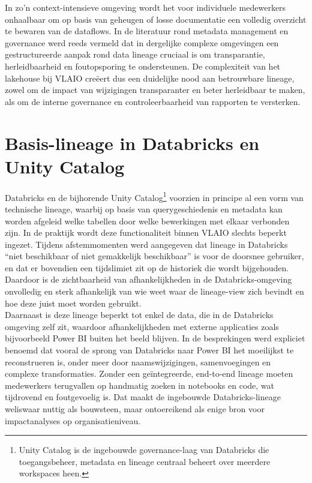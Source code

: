 In zo'n context-intensieve omgeving wordt het voor individuele medewerkers onhaalbaar om op basis van geheugen of losse documentatie een volledig overzicht te bewaren van de dataflows. In de literatuur rond metadata management en governance werd reeds vermeld dat in dergelijke complexe omgevingen een gestructureerde aanpak rond data lineage cruciaal is om transparantie, herleidbaarheid en foutopsporing te ondersteunen. De complexiteit van het lakehouse bij VLAIO creëert dus een duidelijke nood aan betrouwbare lineage, zowel om de impact van wijzigingen transparanter en beter herleidbaar te maken, als om de interne governance en controleerbaarheid van rapporten te versterken.\\

\section{Basis-lineage in Databricks en Unity Catalog}

Databricks en de bijhorende Unity Catalog\footnote{Unity Catalog is de ingebouwde governance-laag van Databricks die toegangsbeheer, metadata en lineage centraal beheert over meerdere workspaces heen.} voorzien in principe al een vorm van technische lineage, waarbij op basis van querygeschiedenis en metadata kan worden afgeleid welke tabellen door welke bewerkingen met elkaar verbonden zijn. In de praktijk wordt deze functionaliteit binnen VLAIO slechts beperkt ingezet. Tijdens afstemmomenten werd aangegeven dat lineage in Databricks “niet beschikbaar of niet gemakkelijk beschikbaar” is voor de doorsnee gebruiker, en dat er bovendien een tijdslimiet zit op de historiek die wordt bijgehouden. Daardoor is de zichtbaarheid van afhankelijkheden in de Databricks-omgeving onvolledig en sterk afhankelijk van wie weet waar de lineage-view zich bevindt en hoe deze juist moet worden gebruikt.\\

Daarnaast is deze lineage beperkt tot enkel de data, die in de Databricks omgeving zelf zit, waardoor afhankelijk\-heden met externe applicaties zoals bijvoorbeeld Power BI buiten het beeld blijven. In de besprekingen werd expliciet benoemd dat vooral de sprong van Databricks naar Power BI het moeilijkst te reconstrueren is, onder meer door naamswijzigingen, samenvoegingen en complexe transformaties. Zonder een geïntegreerde, end-to-end lineage moeten medewerkers terugvallen op handmatig zoeken in notebooks en code, wat tijdrovend en foutgevoelig is. Dat maakt de ingebouwde Databricks-lineage weliswaar nuttig als bouwsteen, maar ontoereikend als enige bron voor impactanalyses op organisatieniveau.\\

